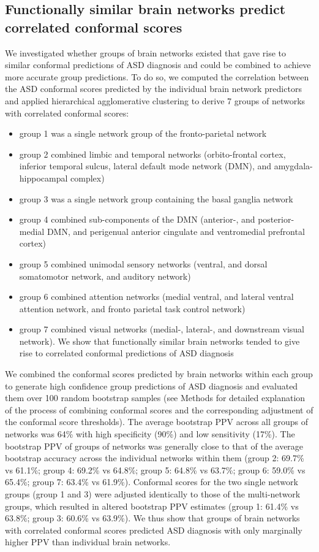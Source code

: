 \documentclass[9pt,lineno]{elife}
\begin{document}
\subsection{Functionally similar brain networks predict correlated conformal scores}
We investigated whether groups of brain networks existed that gave rise to similar conformal predictions of ASD diagnosis and could be combined to achieve more accurate group predictions. To do so, we computed the correlation between the ASD conformal scores predicted by the individual brain network predictors and applied hierarchical agglomerative clustering to derive 7 groups of networks with correlated conformal scores: 
\begin{itemize}
    \item group 1 was a single network group of the fronto-parietal network
    \item group 2 combined limbic and temporal networks (orbito-frontal cortex, inferior temporal sulcus, lateral default mode network (DMN), and amygdala-hippocampal complex)
    \item group 3 was a single network group containing the basal ganglia network
    \item group 4 combined sub-components of the DMN (anterior-, and posterior-medial DMN, and perigenual anterior cingulate and ventromedial prefrontal cortex)
    \item group 5 combined unimodal sensory networks (ventral, and dorsal somatomotor network, and auditory network)
    \item group 6 combined attention networks (medial ventral, and lateral ventral attention network, and fronto parietal task control network)
    \item group 7 combined visual networks (medial-, lateral-, and downstream visual network). We show that functionally similar brain networks tended to give rise to correlated conformal predictions of ASD diagnosis
\end{itemize}

We combined the conformal scores predicted by brain networks within each group to generate high confidence group predictions of ASD diagnosis and evaluated them over 100 random bootstrap samples (see Methods for detailed explanation of the process of combining conformal scores and the corresponding adjustment of the conformal score thresholds). The average bootstrap PPV across all groups of networks was 64\% with high specificity (90\%) and low sensitivity (17\%). The bootstrap PPV of groups of networks was generally close to that of the average bootstrap accuracy across the individual networks within them (group 2: 69.7\% vs 61.1\%; group 4: 69.2\% vs 64.8\%; group 5: 64.8\% vs 63.7\%; group 6: 59.0\% vs 65.4\%; group 7: 63.4\% vs 61.9\%). Conformal scores for the two single network groups (group 1 and 3) were adjusted identically to those of the multi-network groups, which resulted in altered bootstrap PPV estimates (group 1: 61.4\% vs 63.8\%; group 3: 60.6\% vs 63.9\%). We thus show that groups of brain networks with correlated conformal scores predicted ASD diagnosis with only marginally higher PPV than individual brain networks.
\end{document}
